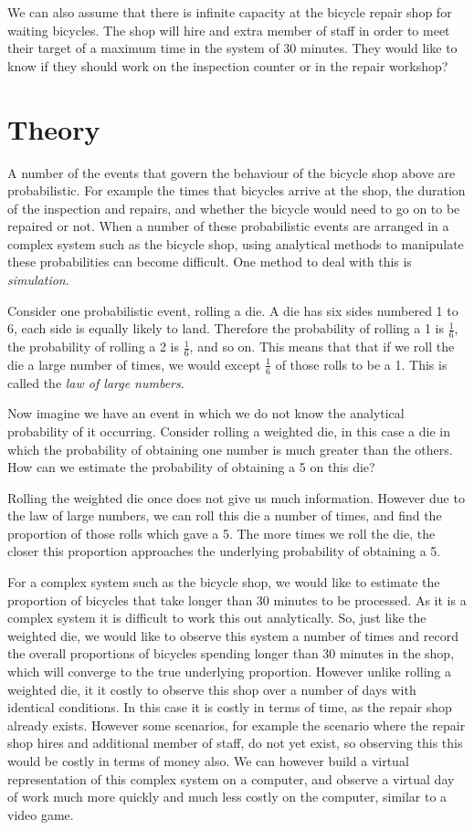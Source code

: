We can also assume that there is infinite capacity at the bicycle repair shop
for waiting bicycles.
The shop will hire and extra member of staff in order to meet their target of a
maximum time in the system of 30 minutes. They would like to know if they
should work on the inspection counter or in the repair workshop?


\section{Theory}\label{sec:theory}

A number of the events that govern the behaviour of the bicycle shop above are
probabilistic. For example the
times that bicycles arrive at the shop, the duration of the inspection and
repairs, and whether the bicycle would need to go on to be repaired or not.
When a number of these probabilistic events are arranged in a complex system
such as the bicycle shop, using analytical methods to manipulate these
probabilities can become difficult. One method to deal with this is
\textit{simulation}.

Consider one probabilistic event, rolling a die.
A die has six sides numbered 1 to 6, each side is equally likely to land.
Therefore the probability of rolling a 1 is $\frac{1}{6}$, the probability of
rolling a 2 is $\frac{1}{6}$, and so on. This means that that if we roll the die
a large number of times, we would except $\frac{1}{6}$ of those rolls to be a 1.
This is called the \textit{law of large numbers}.

Now imagine we have an event in which we do not know the analytical probability
of it occurring. Consider rolling a weighted die, in this case a
die in which the probability of obtaining one number is much greater than the
others. How can we estimate the probability of obtaining a 5 on this die?

Rolling the weighted die once does not give us much information.
However due to the law of large numbers, we can roll this die a number of times,
and find the proportion of those rolls which gave a 5. The more times we roll
the die, the closer this proportion approaches the underlying probability of
obtaining a 5.

For a complex system such as the bicycle shop, we would like to estimate the
proportion of bicycles that take longer than 30 minutes to be processed. As it
is a complex system it is difficult to work this out analytically. So, just
like the weighted die, we would
like to observe this system a number of times and record the overall proportions
of bicycles spending longer than 30 minutes in the shop, which will converge to
the true underlying proportion.
However unlike rolling a weighted die, it it costly to observe this shop over a
number of days with identical conditions. In this case it is costly in terms of
time, as the repair shop already exists. However some scenarios, for example the
scenario where the repair shop hires and additional member of staff, do not yet
exist, so observing this this would be costly in terms of money also.
We can however build a virtual representation of this complex system on a
computer, and observe a virtual day of work much more quickly and much less
costly on the computer, similar to a video game.

